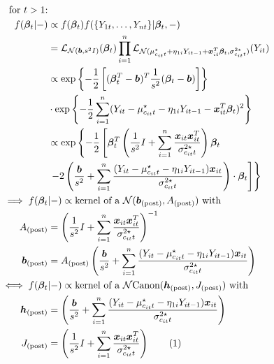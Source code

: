 \documentclass[12pt,	%
	a4paper,		%
	twoside,		%
	openright,		%
	titlepage,%
	]{book}
\theoremstyle{definition}
\begin{document}
\begin{itemize}
\begin{align*}
   \text{for $t>1$:}&\\
    f(\vec{\beta}_t|-) & \propto f(\vec{\beta}_t) f(\{ Y_{1t}, \ldots, Y_{nt}\}| \vec{\beta}_t, -)\\
 & = \law_{\N(\vec{b},s^2 I)}(\vec{\beta}_t) \prod_{i=1}^n \law_{ \N(\mu^\star_{c_{it}t} + \eta_{1i}Y_{it-1} + \vec{x}_{it}^T\vec{\beta}_t,\sigma^{2\star}_{c_{it}t})}(Y_{it}) \\
 & \propto \expp{-\frac{1}{2}\left[ (\vec{\beta}_t^T -\vec{b})^T \frac{1}{s^2} (\vec{\beta}_t-\vec{b}) \right]} \\ & \cdot \expp{-\frac{1}{2} \sum_{i=1}^n ( Y_{it}-\mu^\star_{c_{it}t} -  \eta_{1i}Y_{it-1}-\vec{x}_{it}^T \vec{\beta}_t )^2}\\
 & \propto \exp \left\{-\frac{1}{2} \left[ \vec{\beta}_t^T \left( \frac{1}{s^2}I + \sum_{i=1}^n \frac{\vec{x}_{it}\vec{x}_{it}^T}{\sigma^{2\star}_{c_{it}t}}\right)\vec{\beta}_t \right. \right. \\& \left. \left. - 2\left( \frac{\vec{b}}{s^2} +\sum_{i=1}^n \frac{(Y_{it}- \mu^\star_{c_{it}t}- \eta_{1i}Y_{it-1})\vec{x}_{it}}{\sigma^{2\star}_{c_{it}t}} \right)\cdot \vec{\beta}_t \right] \right\}\\
 \implies f(\vec{\beta}_t&|-) \propto \text{kernel of a $\N(\vec{b}_\post, A_\post)$ with}\\
 A_\post & = \left( \frac{1}{s^2}I + \sum_{i=1}^n \frac{\vec{x}_{it}\vec{x}_{it}^T}{\sigma^{2\star}_{c_{it}t}}\right)^{-1} \\
\vec{b}_\post & = A_\post \left( \frac{\vec{b}}{s^2} +\sum_{i=1}^n \frac{(Y_{it}-\mu^\star_{c_{it}t}- \eta_{1i}Y_{it-1})\vec{x}_{it}}{\sigma^{2\star}_{c_{it}t}} \right) \\
 \iff f(\vec{\beta}_t&|-) \propto \text{kernel of a $\Ncan(\vec{h}_\post, J_\post)$ with}\\
\vec{h}_\post & = \left( \frac{\vec{b}}{s^2} +\sum_{i=1}^n \frac{(Y_{it}-\mu^\star_{c_{it}t}- \eta_{1i}Y_{it-1})\vec{x}_{it}}{\sigma^{2\star}_{c_{it}t}} \right) \\
J_\post & = \left( \frac{1}{s^2}I + \sum_{i=1}^n \frac{\vec{x}_{it}\vec{x}_{it}^T}{\sigma^{2\star}_{c_{it}t}}\right)
\tag{\stepcounter{equation}\theequation}
\end{align*}


\end{itemize}
\end{document}

